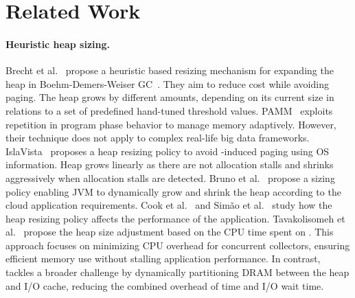 \section{Related Work}

\paragraph{\textbf{Heuristic heap sizing.}}
Brecht et al.~\cite{brecht:nogc} propose a heuristic based resizing mechanism for expanding the heap in Boehm-Demers-Weiser GC~\cite{boehm:gc}.
They aim to reduce \flexheapGC{} cost while avoiding paging.
The heap grows by different amounts, depending on its current size in relations to a set of predefined
hand-tuned threshold values. %
%
PAMM~\cite{zhang:pamm} exploits repetition in program phase behavior to manage memory adaptively.
However, their technique does not apply to complex real-life big data frameworks.
%
IslaVista~\cite{grz:isla_vista} proposes a heap resizing policy to avoid \flexheapGC{}-induced paging using OS information.
Heap grows linearly as there are not allocation stalls and shrinks aggressively when allocation stalls are detected.
%
Bruno et al.~\cite{bruno:resize} propose a sizing policy enabling JVM to dynamically grow and shrink the heap according to the cloud application requirements.
%
Cook et al.~\cite{cook:auto} and Sim{\~a}o et al.~\cite{simao:adaptability} study how the \flexheapGC{} heap resizing policy affects the performance of the application.
%
Tavakolisomeh et al.~\cite{zgc:heap_resize} propose the heap size adjustment based on the CPU time spent on \flexheapGC{}.
This approach focuses on minimizing CPU overhead for concurrent collectors, ensuring efficient memory use without stalling application performance.
%
In contrast, \flexheapName{} tackles a broader challenge by dynamically partitioning DRAM between the heap and I/O cache, reducing the combined overhead of \flexheapGC{} time and I/O wait time.


